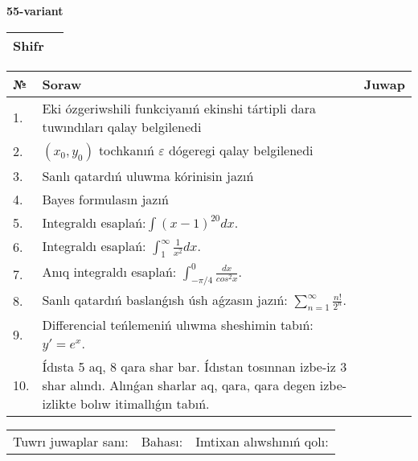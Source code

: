 \documentclass{article}
\begin{document}
  \egroup
  
  \newpage
  
  
  \textbf{55-variant}\\
  
  \bgroup
  \def\arraystretch{1.6} %
  
  \begin{tabular}{|m{5.7cm}|m{9.5cm}|}
  \hline
  Shifr & \\
  \hline
  \end{tabular}
  
  \vspace{1cm}
  
  \begin{tabular}{|m{0.7cm}|m{10cm}|m{4cm}|}
  \hline
  № & Soraw & Juwap \\
  \hline
  1. & Eki ózgeriwshili funkciyanıń ekinshi tártipli dara tuwındıları qalay belgilenedi &  \\
  \hline
  2. & \((x_0,y_0)\) tochkanıń \(\varepsilon\) dógeregi qalay belgilenedi &  \\
  \hline
  3. & Sanlı qatardıń uluwma kórinisin jazıń &  \\
  \hline
  4. & Bayes formulasın jazıń &  \\
  \hline
  5. & Integraldı esaplań:\(\int{(x - 1)^{20}}dx\). &  \\
  \hline
  6. & Integraldı esaplań: \(\int_{1}^{\infty}{\frac{1}{x^2 }dx}\). &  \\
  \hline
  7. & Anıq integraldı esaplań: \(\int_{- \pi/4}^{0}\frac{dx}{cos^2 x}\). &  \\
  \hline
  8. & Sanlı qatardıń baslanǵısh úsh aǵzasın jazıń: \(\sum_{n = 1}^{\infty}\frac{n!}{2^{n}}\). &  \\
  \hline
  9. & Differencial teńlemeniń ulıwma sheshimin tabıń: \(y' = e^{x}\). &  \\
  \hline
  10. & Ídısta 5 aq, 8 qara shar bar. Ídıstan tosınnan izbe-iz 3 shar alındı. Alınǵan sharlar aq, qara, qara degen izbe-izlikte bolıw itimallıǵın tabıń. &  \\
  \hline
  \end{tabular}
  
  \vspace{1cm}
  
  \begin{tabular}{lll}
  Tuwrı juwaplar sanı: \underline{\hspace{1.5cm}} & 
  Bahası: \underline{\hspace{1.5cm}} & 
  Imtixan alıwshınıń qolı: \underline{\hspace{2cm}} \\
  \end{tabular}
  
\end{document}
